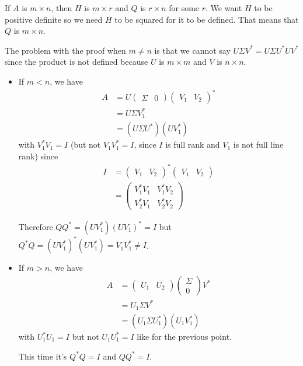 \begin{solution}
  If $A$ is $m \times n$, then $H$ is $m \times r$ and $Q$ is $r \times n$ for some $r$.
  We want $H$ to be positive definite so we need $H$ to be squared for it to be defined.
  That means that $Q$ is $m \times n$.

  The problem with the proof when $m \neq n$ is that we cannot say
  $U \Sigma V^* = U \Sigma U^* U V^*$ since the product is not defined because $U$ is $m \times m$
  and $V$ is $n \times n$.
  \begin{itemize}
    \item If $m < n$, we have
      \begin{align*}
        A
        & = U
        \begin{pmatrix}
          \Sigma & 0
        \end{pmatrix}
        \begin{pmatrix}
          V_1 & V_2
        \end{pmatrix}^*\\
        & = U \Sigma V_1^*\\
        & = (U \Sigma U^*) (U V_1^*)
      \end{align*}
      with $V_1^*V_1 = I$ (but not $V_1V_1^* = I$, since $I$ is full rank and $V_1$ is not full line rank)
      since
      \begin{align*}
        I
        & =
        \begin{pmatrix}
          V_1 & V_2
        \end{pmatrix}^*
        \begin{pmatrix}
          V_1 & V_2
        \end{pmatrix}\\
        & =
        \begin{pmatrix}
          V_1^*V_1 & V_1^*V_2\\
          V_2^*V_1 & V_2^*V_2
        \end{pmatrix}
      \end{align*}

      Therefore $QQ^* = (U V_1^*) (U V_1)^* = I$ but $Q^*Q = (U V_1^*)^* (U V_1^*) = V_1V_1^* \neq I$.
    \item If $m > n$, we have
      \begin{align*}
        A
        & =
        \begin{pmatrix}
          U_1 & U_2
        \end{pmatrix}
        \begin{pmatrix}
          \Sigma \\ 0
        \end{pmatrix}
        V^*\\
        & = U_1 \Sigma V^*\\
        & = (U_1 \Sigma U_1^*) (U_1 V_1^*)
      \end{align*}
      with $U_1^*U_1 = I$ but not $U_1U_1^* = I$ like for the previous point.

      This time it's $Q^*Q = I$ and $QQ^* = I$.
  \end{itemize}
\end{solution}

